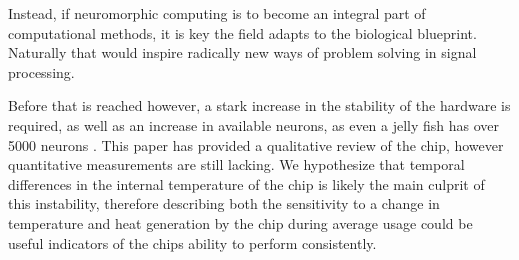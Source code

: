\documentclass[10pt,a4paper]{article}
\begin{document}
Instead, if neuromorphic computing is to become an integral part of
computational methods, it is key the field adapts to the biological blueprint.
Naturally that would inspire radically new ways of problem solving in signal
processing.

Before that is reached however, a stark increase in the stability of the
hardware is required, as well as an increase in available neurons, as even a
jelly fish has over 5000 neurons \cite{neuronsjellyfish}. This paper has
provided a qualitative review of the chip, however quantitative measurements are
still lacking. We hypothesize that temporal differences in the internal
temperature of the chip is likely the main culprit of this instability,
therefore describing both the sensitivity to a change in temperature and heat
generation by the chip during average usage could be useful indicators of the
chips ability to perform consistently.
\end{document}
